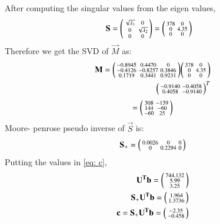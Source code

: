 \documentclass[journal,12pt,twocolumn]{IEEEtran}
\begin{document}
After computing the singular values from the eigen values, \begin{align}
	\mathbf S &= \begin{psmallmatrix}\sqrt{\lambda _1} & 0\\ 0 & \sqrt{\lambda_2}\\ 0 & 0\end{psmallmatrix}
	= \begin{psmallmatrix}378 & 0 \\ 0 & 4.35 \\0 & 0\end{psmallmatrix}
\end{align}
Therefore we get the SVD of $\vec M $ as:
\begin{align}
	\mathbf M = \begin{psmallmatrix}-0.8945& 0.4470 & 0\\
		-0.4126 & -0.8257 & 0.3846\\
		0.1719 & 0.3441 & 0.9231\end{psmallmatrix} \begin{psmallmatrix}378 & 0 \\ 0 & 4.35 \\0 & 0\end{psmallmatrix}\\ \begin{psmallmatrix}-0.9140 & -0.4058\\0.4058& -0.9140\end{psmallmatrix}^T
\end{align}
\begin{align}
	= \begin{psmallmatrix}308 & -139\\144 & -60\\ -60 & 25\end{psmallmatrix} 
\end{align}
Moore- penrose pseudo inverse of $\vec S $ is:
\begin{align}
	\mathbf S_+ = \begin{psmallmatrix}0.0026 &0 &0\\ 0 & 0.2294 & 0\end{psmallmatrix}
\end{align}
Putting the values in \eqref{eq: c},
\begin{align}
	\mathbf {U^Tb}= \begin{psmallmatrix}744.132\\  5.99\\3.25\end{psmallmatrix}\\
	\mathbf {S_+ U^T b}= \begin{psmallmatrix}1.964\\  1.3736\end{psmallmatrix}\\
	\mathbf {c}= \mathbf{S_+ U^T b}= \begin{psmallmatrix}-2.35\\-0.458\end{psmallmatrix}\label{eq: svd sol c}
\end{align}
\end{document}
